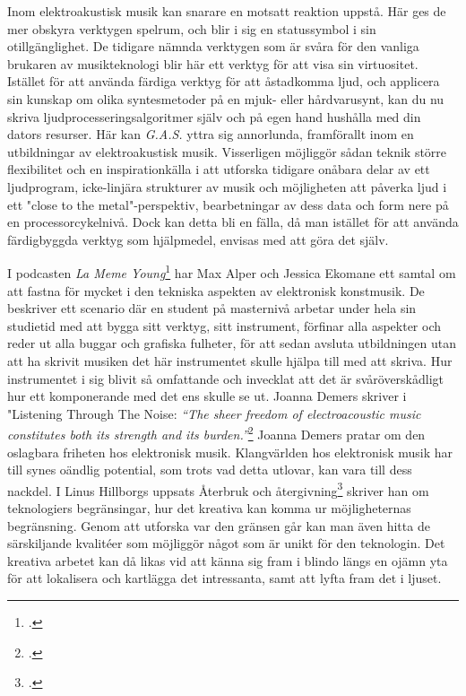 \documentclass{article}
\begin{document}


Inom elektroakustisk musik kan snarare en motsatt reaktion uppstå. Här ges de mer obskyra verktygen spelrum,
och blir i sig en statussymbol i sin otillgänglighet. De tidigare nämnda verktygen som är svåra för den
vanliga brukaren av musikteknologi blir här ett verktyg för att visa sin virtuositet. Istället för att använda
färdiga verktyg för att åstadkomma ljud, och applicera sin kunskap om olika syntesmetoder på en mjuk- eller
hårdvarusynt, kan du nu skriva ljudprocesseringsalgoritmer själv och på egen hand hushålla med din dators
resurser. Här kan \emph{G.A.S.} yttra sig annorlunda, framförallt inom en utbildningar av elektroakustisk
musik. Visserligen möjliggör sådan teknik större flexibilitet och en inspirationkälla i att utforska tidigare
onåbara delar av ett ljudprogram, icke-linjära strukturer av musik och möjligheten att påverka ljud i ett
"close to the metal"-perspektiv, bearbetningar av dess data och form nere på en processorcykelnivå. Dock kan
detta bli en fälla, då man istället för att använda färdigbyggda verktyg som hjälpmedel, envisas med att göra
det själv. 

I podcasten \emph{La Meme Young}\footcite{LaMemeYoung} har Max Alper och Jessica Ekomane ett samtal
om att fastna för mycket i den tekniska aspekten av elektronisk konstmusik. De beskriver ett scenario där en
student på masternivå arbetar under hela sin studietid med att bygga sitt verktyg, sitt instrument, förfinar
alla aspekter och reder ut alla buggar och grafiska fulheter, för att sedan avsluta utbildningen utan att ha
skrivit musiken det här instrumentet skulle hjälpa till med att skriva. Hur instrumentet i sig blivit så
omfattande och invecklat att det är svåröverskådligt hur ett komponerande med det ens skulle se ut. Joanna Demers
skriver i "Listening Through The Noise: \emph{``The sheer freedom of electroacoustic music constitutes both
its strength and its burden.''}\footcite{JoannaDemers} Joanna Demers pratar om den oslagbara friheten hos
elektronisk musik. Klangvärlden hos elektronisk musik har till synes oändlig potential, som trots vad detta
utlovar, kan vara till dess nackdel. I Linus Hillborgs uppsats Återbruk och
återgivning\footcite{LinusHillborg} skriver han om teknologiers begränsingar, hur det kreativa kan komma ur
möjligheternas begränsning. Genom att utforska var den gränsen går kan man även hitta de särskiljande
kvalitéer som möjliggör något som är unikt för den teknologin. Det kreativa arbetet kan då likas vid att känna
sig fram i blindo längs en ojämn yta för att lokalisera och kartlägga det intressanta, samt att lyfta fram det
i ljuset.
\end{document}
